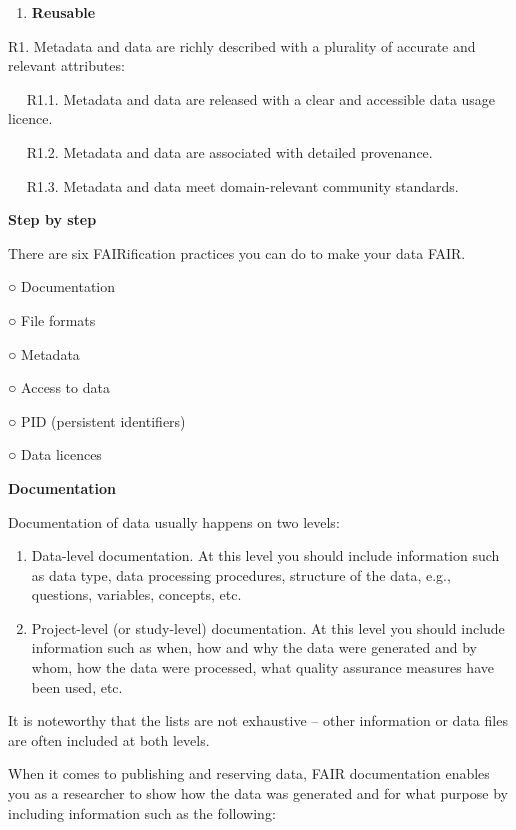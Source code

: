 \documentclass[
]{book}
\providecommand{\tightlist}{%
  \setlength{\itemsep}{0pt}\setlength{\parskip}{0pt}}
\begin{document}
\begin{enumerate}
\def\labelenumi{\arabic{enumi}.}
\setcounter{enumi}{3}
\tightlist
\item
  \textbf{Reusable}
\end{enumerate}

R1. Metadata and data are richly described with a plurality of accurate and relevant attributes:

  R1.1. Metadata and data are released with a clear and accessible data usage licence.

  R1.2. Metadata and data are associated with detailed provenance.

  R1.3. Metadata and data meet domain-relevant community standards.

\textbf{Step by step}

There are six FAIRification practices you can do to make your data FAIR.

○ Documentation

○ File formats

○ Metadata

○ Access to data

○ PID (persistent identifiers)

○ Data licences

\textbf{Documentation}

Documentation of data usually happens on two levels:

\begin{enumerate}
\def\labelenumi{\arabic{enumi}.}
\tightlist
\item
  Data-level documentation. At this level you should include information such as data type, data processing procedures, structure of the data, e.g., questions, variables, concepts, etc.
\item
  Project-level (or study-level) documentation. At this level you should include information such as when, how and why the data were generated and by whom, how the data were processed, what quality assurance measures have been used, etc.
\end{enumerate}

It is noteworthy that the lists are not exhaustive -- other information or data files are often included at both levels.

When it comes to publishing and reserving data, FAIR documentation enables you as a researcher to show how the data was generated and for what purpose by including information such as the following:
\end{document}
